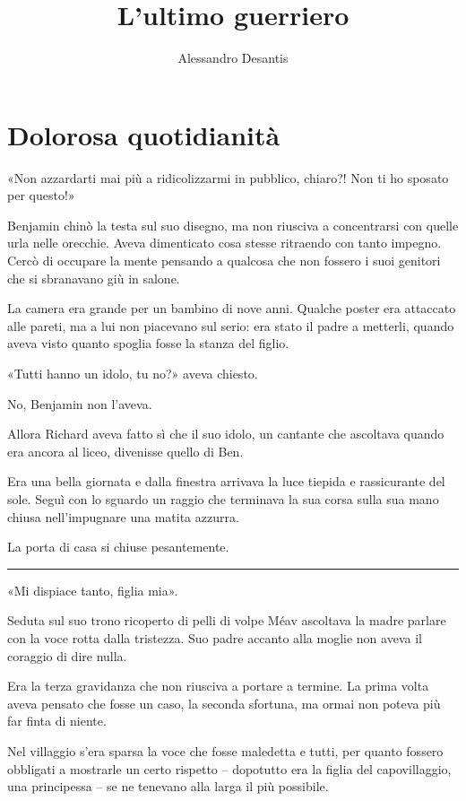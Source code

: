 \documentclass[a4paper,10pt]{memoir}
\title{L'ultimo guerriero}
\author{Alessandro Desantis}
\date{}
\begin{document}
\begin{titlingpage}
\maketitle
\end{titlingpage}

\chapter{Dolorosa quotidianità}

«Non azzardarti mai più a ridicolizzarmi in pubblico, chiaro?! Non ti ho sposato per questo!»

Benjamin chinò la testa sul suo disegno, ma non riusciva a concentrarsi con quelle urla nelle orecchie. Aveva
dimenticato cosa stesse ritraendo con tanto impegno. Cercò di occupare la mente pensando a qualcosa che non fossero i
suoi genitori che si sbranavano giù in salone.

La camera era grande per un bambino di nove anni. Qualche poster era attaccato alle pareti, ma a lui non piacevano sul
serio: era stato il padre a metterli, quando aveva visto quanto spoglia fosse la stanza del figlio.

«Tutti hanno un idolo, tu no?» aveva chiesto.

No, Benjamin non l’aveva.

Allora Richard aveva fatto sì che il suo idolo, un cantante che ascoltava quando era ancora al liceo, divenisse quello
di Ben.

Era una bella giornata e dalla finestra arrivava la luce tiepida e rassicurante del sole. Seguì con lo sguardo un raggio
che terminava la sua corsa sulla sua mano chiusa nell’impugnare una matita azzurra.

La porta di casa si chiuse pesantemente.

\plainbreak{1}

«Mi dispiace tanto, figlia mia».

Seduta sul suo trono ricoperto di pelli di volpe Méav ascoltava la madre parlare con la voce rotta dalla tristezza. Suo
padre accanto alla moglie non aveva il coraggio di dire nulla.

Era la terza gravidanza che non riusciva a portare a termine. La prima volta aveva pensato che fosse un caso, la seconda
sfortuna, ma ormai non poteva più far finta di niente.

Nel villaggio s'era sparsa la voce che fosse maledetta e tutti, per quanto fossero obbligati a mostrarle un certo
rispetto -- dopotutto era la figlia del capovillaggio, una principessa -- se ne tenevano alla larga il più possibile.
\end{document}
